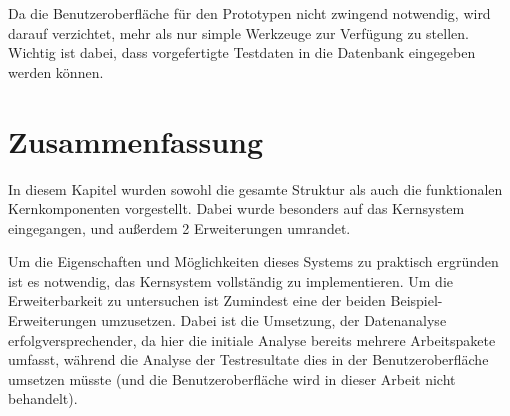 Da die Benutzeroberfläche für den Prototypen nicht zwingend notwendig,
wird darauf verzichtet, mehr als nur simple Werkzeuge zur Verfügung zu stellen.
Wichtig ist dabei, dass vorgefertigte Testdaten in die Datenbank eingegeben werden können.


\section{Zusammenfassung}

In diesem Kapitel wurden sowohl die gesamte Struktur als auch die funktionalen Kernkomponenten vorgestellt.
Dabei wurde besonders auf das Kernsystem eingegangen,
und außerdem 2 Erweiterungen umrandet.

Um die Eigenschaften und Möglichkeiten dieses Systems zu praktisch ergründen ist es notwendig, das Kernsystem vollständig zu implementieren.
Um die Erweiterbarkeit zu untersuchen ist Zumindest eine der beiden Beispiel-Erweiterungen umzusetzen. Dabei ist die Umsetzung,
der Datenanalyse erfolgversprechender, da hier die initiale Analyse bereits mehrere Arbeitspakete umfasst, während die Analyse der Testresultate dies in der Benutzeroberfläche umsetzen müsste (und die Benutzeroberfläche wird in dieser Arbeit nicht behandelt).
